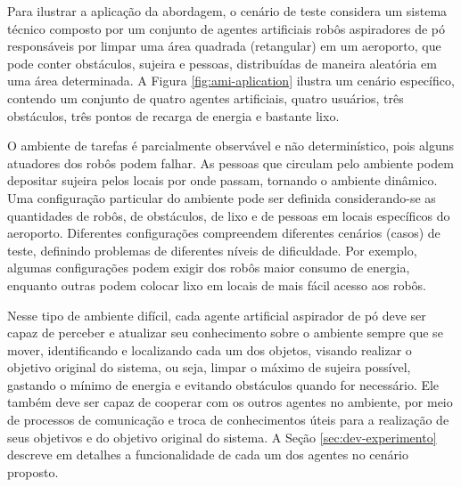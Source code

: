Para ilustrar a aplicação da abordagem, o cenário de teste considera um sistema técnico composto por um conjunto de agentes artificiais robôs aspiradores de pó responsáveis por limpar uma área quadrada (retangular) em um aeroporto, que pode conter obstáculos, sujeira e pessoas, distribuídas de maneira aleatória em uma área determinada. A Figura \ref{fig:ami-aplication} ilustra um cenário específico, contendo um conjunto de quatro agentes artificiais, quatro usuários, três obstáculos, três pontos de recarga de energia e bastante lixo. 

\begin{figure}[h!]
    \centering
\end{figure}

O ambiente de tarefas é parcialmente observável e não determinístico, pois alguns atuadores dos robôs podem falhar. As pessoas que circulam pelo ambiente podem depositar sujeira pelos locais por onde passam, tornando o ambiente dinâmico. Uma configuração particular do ambiente pode ser definida considerando-se as quantidades de robôs, de obstáculos, de lixo e de pessoas em locais específicos do aeroporto. Diferentes configurações compreendem diferentes cenários (casos) de teste, definindo problemas de diferentes níveis de dificuldade. Por exemplo, algumas configurações podem exigir dos robôs maior consumo de energia, enquanto outras podem colocar lixo em locais de mais fácil acesso aos robôs. 

Nesse tipo de ambiente difícil, cada agente artificial aspirador de pó deve ser capaz de perceber e atualizar seu conhecimento sobre o ambiente sempre que se mover, identificando e localizando cada um dos objetos, visando realizar o objetivo original do sistema, ou seja, limpar o máximo de sujeira possível, gastando o mínimo de energia e evitando obstáculos quando for necessário. Ele também deve ser capaz de cooperar com os outros agentes no ambiente, por meio de processos de comunicação e troca de conhecimentos úteis para a realização de seus objetivos e do objetivo original do sistema. A Seção \ref{sec:dev-experimento} descreve em detalhes a funcionalidade de cada um dos agentes no cenário proposto. 


